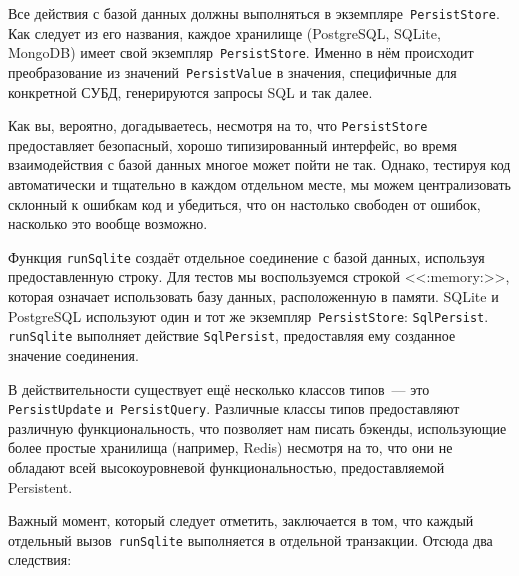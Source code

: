 Все действия с базой данных должны выполняться в
экземпляре~\lstinline'PersistStore'. Как следует из его названия, каждое
хранилище (PostgreSQL, SQLite, MongoDB) имеет свой
экземпляр~\lstinline'PersistStore'. Именно в нём происходит преобразование из
значений~\lstinline'PersistValue' в значения, специфичные для конкретной СУБД,
генерируются запросы SQL и так далее.

\begin{remark}
    Как вы, вероятно, догадываетесь, несмотря на то, что
    \lstinline'PersistStore' предоставляет безопасный, хорошо типизированный
    интерфейс, во время взаимодействия с базой данных многое может пойти не
    так. Однако, тестируя код автоматически и тщательно в каждом отдельном
    месте, мы можем централизовать склонный к ошибкам код и убедиться, что он
    настолько свободен от ошибок, насколько это вообще возможно.
\end{remark}

Функция \lstinline'runSqlite' создаёт отдельное соединение с базой данных,
используя предоставленную строку. Для тестов мы воспользуемся строкой
<<:memory:>>, которая означает использовать базу данных, расположенную в
памяти. SQLite и PostgreSQL используют один и тот же
экземпляр~\lstinline'PersistStore': \lstinline'SqlPersist'.
\lstinline'runSqlite' выполняет действие \lstinline'SqlPersist', предоставляя
ему созданное значение соединения.

\begin{remark}
    В действительности существует ещё несколько классов типов~--- это
    \lstinline'PersistUpdate' и~\lstinline'PersistQuery'. Различные классы
    типов предоставляют различную функциональность, что позволяет нам писать
    бэкенды, использующие более простые хранилища (например, Redis) несмотря на
    то, что они не обладают всей высокоуровневой функциональностью,
    предоставляемой Persistent.
\end{remark}

Важный момент, который следует отметить, заключается в том, что каждый
отдельный вызов~\lstinline'runSqlite' выполняется в отдельной транзакции.
Отсюда два следствия:

